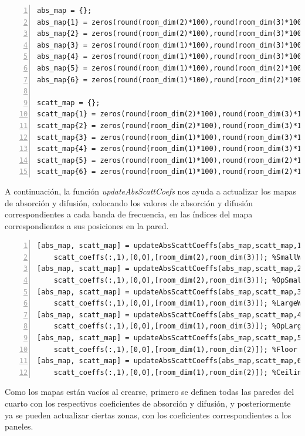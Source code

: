 \begin{lstlisting}[frame=single,numbers=left, style=Matlab-editor, basicstyle=\tiny]
abs_map = {};
abs_map{1} = zeros(round(room_dim(2)*100),round(room_dim(3)*100),num_FBands);
abs_map{2} = zeros(round(room_dim(2)*100),round(room_dim(3)*100),num_FBands);
abs_map{3} = zeros(round(room_dim(1)*100),round(room_dim(3)*100),num_FBands);
abs_map{4} = zeros(round(room_dim(1)*100),round(room_dim(3)*100),num_FBands);
abs_map{5} = zeros(round(room_dim(1)*100),round(room_dim(2)*100),num_FBands);
abs_map{6} = zeros(round(room_dim(1)*100),round(room_dim(2)*100),num_FBands);

scatt_map = {};
scatt_map{1} = zeros(round(room_dim(2)*100),round(room_dim(3)*100),num_FBands);
scatt_map{2} = zeros(round(room_dim(2)*100),round(room_dim(3)*100),num_FBands);
scatt_map{3} = zeros(round(room_dim(1)*100),round(room_dim(3)*100),num_FBands);
scatt_map{4} = zeros(round(room_dim(1)*100),round(room_dim(3)*100),num_FBands);
scatt_map{5} = zeros(round(room_dim(1)*100),round(room_dim(2)*100),num_FBands);
scatt_map{6} = zeros(round(room_dim(1)*100),round(room_dim(2)*100),num_FBands);
\end{lstlisting}
A continuación, la función \textit{updateAbsScattCoefs} nos ayuda a actualizar los mapas de absorción y difusión, colocando los valores de absorción y difusión correspondientes a cada banda de frecuencia, en las índices del mapa correspondientes a sus posiciones en la pared.
\begin{lstlisting}[frame=single,numbers=left, style=Matlab-editor, basicstyle=\tiny]
[abs_map, scatt_map] = updateAbsScattCoeffs(abs_map,scatt_map,1,abs_coeffs(:,1),...
    scatt_coeffs(:,1),[0,0],[room_dim(2),room_dim(3)]); %SmallWall
[abs_map, scatt_map] = updateAbsScattCoeffs(abs_map,scatt_map,2,abs_coeffs(:,1),...
    scatt_coeffs(:,1),[0,0],[room_dim(2),room_dim(3)]); %OpSmallWall
[abs_map, scatt_map] = updateAbsScattCoeffs(abs_map,scatt_map,3,abs_coeffs(:,1),...
    scatt_coeffs(:,1),[0,0],[room_dim(1),room_dim(3)]); %LargeWall
[abs_map, scatt_map] = updateAbsScattCoeffs(abs_map,scatt_map,4,abs_coeffs(:,1),...
    scatt_coeffs(:,1),[0,0],[room_dim(1),room_dim(3)]); %OpLargeWall
[abs_map, scatt_map] = updateAbsScattCoeffs(abs_map,scatt_map,5,abs_coeffs(:,1),...
    scatt_coeffs(:,1),[0,0],[room_dim(1),room_dim(2)]); %Floor
[abs_map, scatt_map] = updateAbsScattCoeffs(abs_map,scatt_map,6,abs_coeffs(:,1),...
    scatt_coeffs(:,1),[0,0],[room_dim(1),room_dim(2)]); %Ceiling
\end{lstlisting}
Como los mapas están vacíos al crearse, primero se definen todas las paredes del cuarto con los respectivos coeficientes de absorción y difusión, y posteriormente ya se pueden actualizar ciertas zonas, con los coeficientes correspondientes a los paneles. \\
